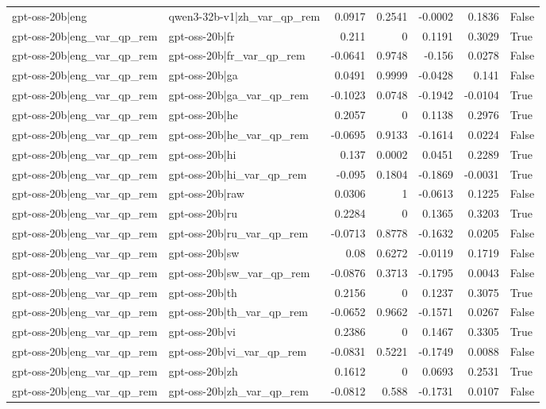 \begin{table}
\begin{tabular}{l l r r r r l}
gpt-oss-20b|eng & qwen3-32b-v1|zh_var_qp_rem & 0.0917 & 0.2541 & -0.0002 & 0.1836 & False \\
gpt-oss-20b|eng_var_qp_rem & gpt-oss-20b|fr & 0.211 & 0 & 0.1191 & 0.3029 & True \\
gpt-oss-20b|eng_var_qp_rem & gpt-oss-20b|fr_var_qp_rem & -0.0641 & 0.9748 & -0.156 & 0.0278 & False \\
gpt-oss-20b|eng_var_qp_rem & gpt-oss-20b|ga & 0.0491 & 0.9999 & -0.0428 & 0.141 & False \\
gpt-oss-20b|eng_var_qp_rem & gpt-oss-20b|ga_var_qp_rem & -0.1023 & 0.0748 & -0.1942 & -0.0104 & True \\
gpt-oss-20b|eng_var_qp_rem & gpt-oss-20b|he & 0.2057 & 0 & 0.1138 & 0.2976 & True \\
gpt-oss-20b|eng_var_qp_rem & gpt-oss-20b|he_var_qp_rem & -0.0695 & 0.9133 & -0.1614 & 0.0224 & False \\
gpt-oss-20b|eng_var_qp_rem & gpt-oss-20b|hi & 0.137 & 0.0002 & 0.0451 & 0.2289 & True \\
gpt-oss-20b|eng_var_qp_rem & gpt-oss-20b|hi_var_qp_rem & -0.095 & 0.1804 & -0.1869 & -0.0031 & True \\
gpt-oss-20b|eng_var_qp_rem & gpt-oss-20b|raw & 0.0306 & 1 & -0.0613 & 0.1225 & False \\
gpt-oss-20b|eng_var_qp_rem & gpt-oss-20b|ru & 0.2284 & 0 & 0.1365 & 0.3203 & True \\
gpt-oss-20b|eng_var_qp_rem & gpt-oss-20b|ru_var_qp_rem & -0.0713 & 0.8778 & -0.1632 & 0.0205 & False \\
gpt-oss-20b|eng_var_qp_rem & gpt-oss-20b|sw & 0.08 & 0.6272 & -0.0119 & 0.1719 & False \\
gpt-oss-20b|eng_var_qp_rem & gpt-oss-20b|sw_var_qp_rem & -0.0876 & 0.3713 & -0.1795 & 0.0043 & False \\
gpt-oss-20b|eng_var_qp_rem & gpt-oss-20b|th & 0.2156 & 0 & 0.1237 & 0.3075 & True \\
gpt-oss-20b|eng_var_qp_rem & gpt-oss-20b|th_var_qp_rem & -0.0652 & 0.9662 & -0.1571 & 0.0267 & False \\
gpt-oss-20b|eng_var_qp_rem & gpt-oss-20b|vi & 0.2386 & 0 & 0.1467 & 0.3305 & True \\
gpt-oss-20b|eng_var_qp_rem & gpt-oss-20b|vi_var_qp_rem & -0.0831 & 0.5221 & -0.1749 & 0.0088 & False \\
gpt-oss-20b|eng_var_qp_rem & gpt-oss-20b|zh & 0.1612 & 0 & 0.0693 & 0.2531 & True \\
gpt-oss-20b|eng_var_qp_rem & gpt-oss-20b|zh_var_qp_rem & -0.0812 & 0.588 & -0.1731 & 0.0107 & False \\

\end{tabular}
\end{table}
